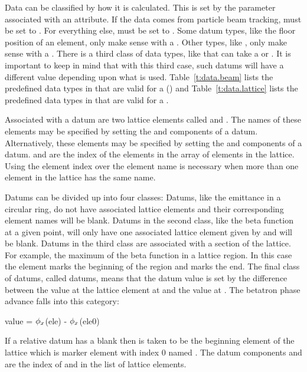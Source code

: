 Data can be classified by how it is calculated. This is set by the
 parameter associated with an attribute. If the data
comes from particle beam tracking,  must be set to
. For everything else,  must be set to
. Some datum types, like the floor position of an
element, only make sense with a  . Other
types, like , only make sense with a 
. There is a third class of data types, like
 that can take a  or 
. It is important to keep in mind that with this third
case, such datums will have a different value depending upon what
 is used.  Table~\ref{t:data.beam} lists the
predefined data types in \tao that are valid for a 
 () and
Table~\ref{t:data.lattice} lists the predefined data types in
\tao that are valid for a  .

Associated with a datum are two lattice elements called  and
.  The names of these elements may be specified by setting
the  and  components of a
datum. Alternatively, these elements may be specified by setting the
 and  components of a datum.  and
 are the index of the elements in the array of elements in
the lattice. Using the element index over the element name is
necessary when more than one element in the lattice has the same name.

Datums can be divided up into four classes:  Datums, like
the emittance in a circular ring, do not have associated lattice
elements and their corresponding element names will be blank. Datums
in the second class, like the beta function at a given point, will
only have one associated lattice element given by  and
 will be blank.  Datums in the third class are
associated with a section of the lattice. For example, the maximum of
the beta function in a lattice region. In this case the 
element marks the beginning of the region and  marks the
end. The final class of datums, called  datums, means
that the datum value is set by the difference between the value at the
lattice element at  and the value at . The betatron
phase advance falls into this category:
\begin{example}
  value = \(\phi\sb{x}\)(ele) - \(\phi\sb{x}\)(ele0)
\end{example}
If a relative datum has a blank  then  is taken
to be the beginning element of the lattice which is marker element
with index 0 named .
The datum components  and  are the index of
 and  in the list of lattice elements.

